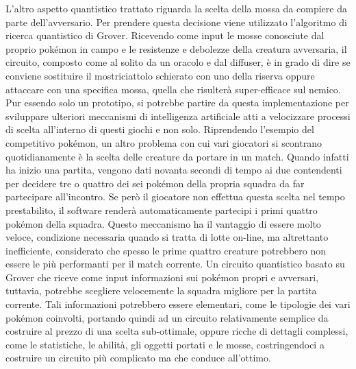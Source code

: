 \documentclass{book}
\theoremstyle{definition}
\theoremstyle{definition}
\theoremstyle{definition}
\theoremstyle{plain}
\theoremstyle{plain}
\theoremstyle{plain}
\theoremstyle{plain}
\begin{document}
L'altro aspetto quantistico trattato riguarda la scelta della mossa da compiere da parte dell'avversario. Per prendere questa decisione viene utilizzato l'algoritmo di ricerca quantistico di Grover. Ricevendo come input le mosse conosciute dal proprio pokémon in campo e le resistenze e debolezze della creatura avversaria, il circuito, composto come al solito da un oracolo e dal diffuser, è in grado di dire se conviene sostituire il mostriciattolo schierato con uno della riserva oppure attaccare con una specifica mossa, quella che risulterà super-efficace sul nemico. Pur essendo solo un prototipo, si potrebbe partire da questa implementazione per sviluppare ulteriori meccanismi di intelligenza artificiale atti a velocizzare processi di scelta all'interno di questi giochi e non solo. Riprendendo l'esempio del competitivo pokémon, un altro problema con cui vari giocatori si scontrano quotidianamente è la scelta delle creature da portare in un match. Quando infatti ha inizio una partita, vengono dati novanta secondi di tempo ai due contendenti per decidere tre o quattro dei sei pokémon della propria squadra da far partecipare all'incontro. Se però il giocatore non effettua questa scelta nel tempo prestabilito, il software renderà automaticamente partecipi i primi quattro pokémon della squadra. Questo meccanismo ha il vantaggio di essere molto veloce, condizione necessaria quando si tratta di lotte on-line, ma altrettanto inefficiente, considerato che spesso le prime quattro creature potrebbero non essere le più performanti per il match corrente. Un circuito quantistico basato su Grover che riceve come input informazioni sui pokémon propri e avversari, tuttavia, potrebbe scegliere velocemente la squadra migliore per la partita corrente. Tali informazioni potrebbero essere elementari, come le tipologie dei vari pokémon coinvolti, portando quindi ad un circuito relativamente semplice da costruire al prezzo di una scelta sub-ottimale, oppure ricche di dettagli complessi, come le statistiche, le abilità, gli oggetti portati e le mosse, costringendoci a costruire un circuito più complicato ma che conduce all'ottimo. 
\end{document}
